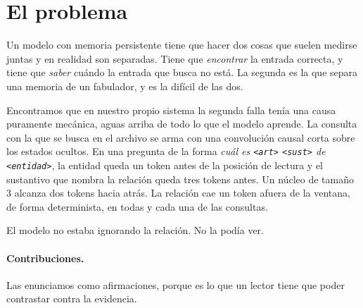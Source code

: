 \documentclass[11pt,a4paper]{article}
\begin{document}
\section{El problema}

Un modelo con memoria persistente tiene que hacer dos cosas que suelen medirse juntas y en realidad
son separadas. Tiene que \emph{encontrar} la entrada correcta, y tiene que \emph{saber} cuándo la
entrada que busca no está. La segunda es la que separa una memoria de un fabulador, y es la difícil de
las dos.

Encontramos que en nuestro propio sistema la segunda falla tenía una causa puramente mecánica, aguas
arriba de todo lo que el modelo aprende. La consulta con la que se busca en el archivo se arma con una
convolución causal corta sobre los estados ocultos. En una pregunta de la forma \emph{cuál es
\texttt{<art>} \texttt{<sust>} de \texttt{<entidad>}}, la entidad queda un token antes de la posición
de lectura y el sustantivo que nombra la relación queda tres tokens antes. Un núcleo de tamaño $3$
alcanza dos tokens hacia atrás. La relación cae un token afuera de la ventana, de forma determinista,
en todas y cada una de las consultas.

El modelo no estaba ignorando la relación. No la podía ver.


\paragraph{Contribuciones.} Las enunciamos como afirmaciones, porque es lo que un lector tiene que
poder contrastar contra la evidencia.
\end{document}
